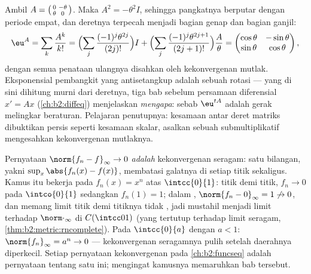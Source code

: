 \begin{example}\label{ex:b2:nvs:rotationexp}
Ambil $A = \begin{psmallmatrix}0 & -\theta\\ \theta &
0\end{psmallmatrix}$. Maka $A^2 = -\theta^2 I$, sehingga pangkatnya
berputar dengan periode empat, dan deretnya terpecah menjadi bagian genap
dan bagian ganjil:
\[
\eu^{A} = \sum_{k}\frac{A^k}{k!}
= \Bigl(\sum_{j}\frac{(-1)^j\theta^{2j}}{(2j)!}\Bigr) I
+ \Bigl(\sum_{j}\frac{(-1)^j\theta^{2j+1}}{(2j+1)!}\Bigr)
\frac{A}{\theta}
= \begin{pmatrix}
\cos\theta & -\sin\theta\\
\sin\theta & \cos\theta
\end{pmatrix},
\]
dengan semua penataan ulangnya disahkan oleh kekonvergenan mutlak.
Eksponensial pembangkit yang antisetangkup adalah sebuah rotasi ---
yang di sini dihitung murni dari deretnya, tiga bab sebelum
persamaan diferensial $x' = Ax$ (\cref{ch:b2:diffeq}) menjelaskan
\emph{mengapa}: sebab $\eu^{tA}$ adalah gerak melingkar beraturan.
Pelajaran penutupnya: kesamaan antar deret matriks dibuktikan persis
seperti kesamaan skalar, asalkan sebuah  submultiplikatif
mengesahkan kekonvergenan mutlaknya.
\end{example}

\begin{example}\label{ex:b2:nvs:uniformdictionary}
Pernyataan $\norm{f_n - f}_\infty \to 0$ \emph{adalah} kekonvergenan
seragam: satu bilangan, yakni $\sup_x\abs{f_n(x) - f(x)}$, membatasi
galatnya di setiap titik sekaligus. Kamus itu bekerja pada $f_n(x) = x^n$
atas $\intcc{0}{1}$: titik demi titik, $f_n \to 0$ pada $\intco{0}{1}$
sedangkan $f_n(1) = 1$; dalam , $\norm{f_n - 0}_\infty = 1 \not\to
0$, dan memang limit titik demi titiknya tidak , jadi mustahil
menjadi limit terhadap $\norm\cdot_\infty$ di $C(\intcc01)$ (yang
tertutup terhadap limit seragam, \cref{thm:b2:metric:rncomplete}). Pada
$\intcc{0}{a}$ dengan $a < 1$: $\norm{f_n}_\infty = a^n \to 0$ ---
kekonvergenan seragamnya pulih setelah daerahnya diperkecil. Setiap
pernyataan kekonvergenan pada \cref{ch:b2:funcseq} adalah pernyataan
tentang satu  ini; mengingat kamusnya memaruhkan bab tersebut.
\end{example}

